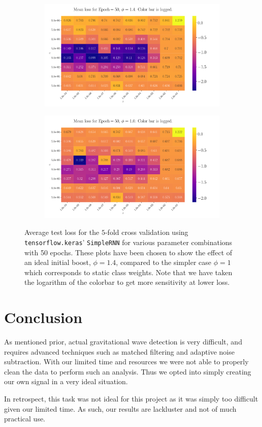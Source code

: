 \documentclass[%
reprint,
amsmath,amssymb,
aps,
]{revtex4-2}
\begin{document}
\begin{figure}[ht!]
	\begin{subfigure}{0.499\textwidth}
		\includegraphics[width=\textwidth]{Figures/2D_Plot_Loss_Epoch50_Boost1.4.pdf}
	\end{subfigure}
	\newline
	\begin{subfigure}{0.499\textwidth}
		\includegraphics[width=\textwidth]{Figures/2D_Plot_Loss_Epoch50_Boost1.0.pdf}
	\end{subfigure}
	\caption{Average test loss for the $5$-fold cross validation using \texttt{tensorflow.keras}' \texttt{SimpleRNN} for various parameter combinations with 50 epochs. These plots have been chosen to show the effect of an ideal initial boost, $\phi=1.4$, compared to the simpler case $\phi=1$ which corresponds to static class weights. Note that we have taken the logarithm of the colorbar to get more sensitivity at lower loss.}
	\label{fig:PhiShowcase}	
\end{figure}


\section{Conclusion}
As mentioned prior, actual gravitational wave detection is very difficult, and requires advanced techniques such as matched filtering and adaptive noise subtraction. With our limited time and resources we were not able to properly clean the data to perform such an analysis. Thus we opted into simply creating our own signal in a very ideal situation. 

In retrospect, this task was not ideal for this project as it was simply too difficult given our limited time. As such, our results are lackluster and not of much practical use.



	
\end{document}
